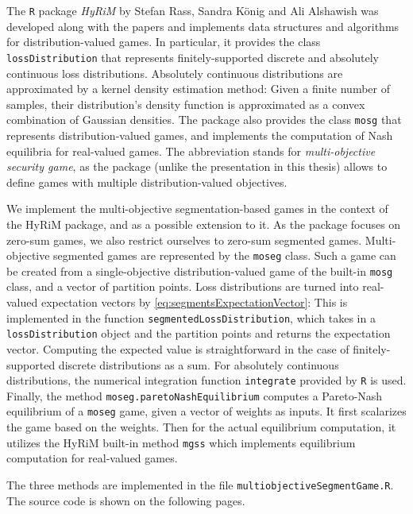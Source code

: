 \documentclass[a4paper,DIV=11,abstracton,twoside=semi]{scrreprt}
\theoremstyle{definition}
\begin{document}
    The \texttt{R} package \emph{HyRiM} \cite{bib:hyrimPackage} by Stefan Rass, Sandra König and Ali Alshawish was developed along with the papers \cite{bib:rassGameRiskManagI,bib:rassGameRiskManagII,bib:rassGameRiskManagIII} and implements data structures and algorithms for distribution-valued games.
    In particular, it provides the class \texttt{lossDistribution} that represents finitely-supported discrete and absolutely continuous loss distributions. Absolutely continuous distributions are approximated by a kernel density estimation method: Given a finite number of samples, their distribution's density function is approximated as a convex combination of Gaussian densities. The package also provides the class \texttt{mosg} that represents distribution-valued games, and implements the computation of Nash equilibria for real-valued games. 
    The abbreviation stands for \emph{multi-objective security game}, as the package (unlike the presentation in this thesis) allows to define games with multiple distribution-valued objectives.
    
    We implement the multi-objective segmentation-based games in the context of the HyRiM package, and as a possible extension to it. As the package focuses on zero-sum games, we also restrict ourselves to zero-sum segmented games.
    Multi-objective segmented games are represented by the \texttt{moseg} class. Such a game can be created from a single-objective distribution-valued game of the built-in \texttt{mosg} class, and a vector of partition points.
    Loss distributions are turned into real-valued expectation vectors by \eqref{eq:segmentsExpectationVector}: This is implemented in the function \texttt{segmentedLossDistribution}, which takes in a \texttt{lossDistribution} object and the partition points and returns the expectation vector.
    Computing the expected value is straightforward in the case of finitely-supported discrete distributions as a sum. For absolutely continuous distributions, the numerical integration function \texttt{integrate} provided by \texttt{R} is used.
    Finally, the method \texttt{moseg.paretoNashEquilibrium} computes a Pareto-Nash equilibrium of a \texttt{moseg} game, given a vector of weights as inputs.
    It first scalarizes the game based on the weights.
    Then for the actual equilibrium computation, it utilizes the HyRiM built-in method \texttt{mgss} which implements equilibrium computation for real-valued games.
    
    The three methods are implemented in the file \texttt{multiobjectiveSegmentGame.R}. The source code is shown on the following pages.
    
\end{document}
